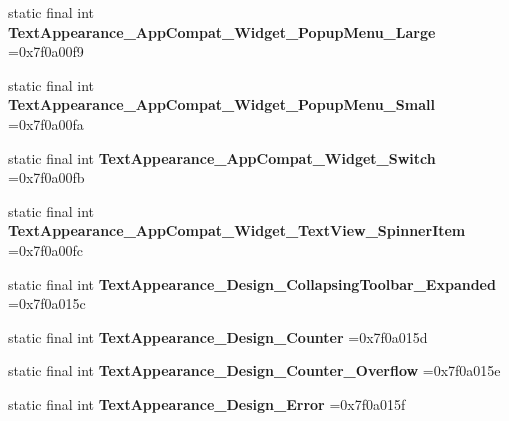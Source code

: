 \begin{DoxyCompactItemize}
static final int {\bfseries Text\+Appearance\+\_\+\+App\+Compat\+\_\+\+Widget\+\_\+\+Popup\+Menu\+\_\+\+Large} =0x7f0a00f9
\item 
\mbox{\label{classproject4_1_1xaria_1_1R_1_1style_ab674352fe2c28ed3c3b00796d5d74803}} 
static final int {\bfseries Text\+Appearance\+\_\+\+App\+Compat\+\_\+\+Widget\+\_\+\+Popup\+Menu\+\_\+\+Small} =0x7f0a00fa
\item 
\mbox{\label{classproject4_1_1xaria_1_1R_1_1style_a70e7867c892c5ca22c10b3cdb4d59288}} 
static final int {\bfseries Text\+Appearance\+\_\+\+App\+Compat\+\_\+\+Widget\+\_\+\+Switch} =0x7f0a00fb
\item 
\mbox{\label{classproject4_1_1xaria_1_1R_1_1style_a13bb28fd7e0f56247422c99a8330f7f3}} 
static final int {\bfseries Text\+Appearance\+\_\+\+App\+Compat\+\_\+\+Widget\+\_\+\+Text\+View\+\_\+\+Spinner\+Item} =0x7f0a00fc
\item 
\mbox{\label{classproject4_1_1xaria_1_1R_1_1style_a9c3d26262e2c77a648ac4db8fa06f7ee}} 
static final int {\bfseries Text\+Appearance\+\_\+\+Design\+\_\+\+Collapsing\+Toolbar\+\_\+\+Expanded} =0x7f0a015c
\item 
\mbox{\label{classproject4_1_1xaria_1_1R_1_1style_ac030e03f4139b5d2b00ffe7c12f86d37}} 
static final int {\bfseries Text\+Appearance\+\_\+\+Design\+\_\+\+Counter} =0x7f0a015d
\item 
\mbox{\label{classproject4_1_1xaria_1_1R_1_1style_aaf275f50f13d913ba2045cf72d58cb85}} 
static final int {\bfseries Text\+Appearance\+\_\+\+Design\+\_\+\+Counter\+\_\+\+Overflow} =0x7f0a015e
\item 
\mbox{\label{classproject4_1_1xaria_1_1R_1_1style_a0319bd7c41f60de1b60fd59b7e7a6b0d}} 
static final int {\bfseries Text\+Appearance\+\_\+\+Design\+\_\+\+Error} =0x7f0a015f
\item 
\mbox{\label{classproject4_1_1xaria_1_1R_1_1style_a1bfaca4e0ffcdbbcc54bdd52979ec257}} 

\end{DoxyCompactItemize}
